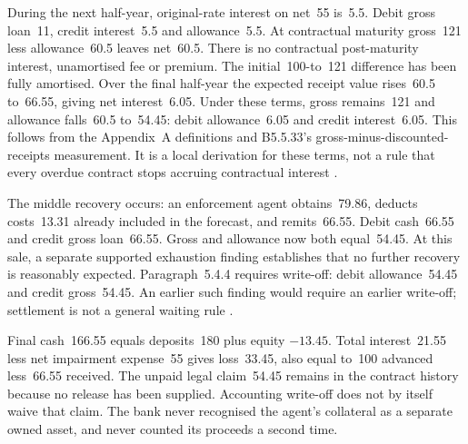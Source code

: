 During the next half-year, original-rate interest on net~55 is~5.5.
Debit gross loan~11, credit interest~5.5 and allowance~5.5. At contractual
maturity gross~121 less allowance~60.5 leaves net~60.5. There is no contractual
post-maturity interest, unamortised fee or premium. The initial~100-to~121
difference has been fully amortised. Over the final half-year the expected
receipt value rises~60.5 to~66.55, giving net interest~6.05. Under these terms,
gross remains~121 and allowance falls~60.5 to~54.45: debit allowance~6.05 and
credit interest~6.05. This follows from the Appendix~A definitions and
B5.5.33's gross-minus-discounted-receipts measurement. It is a local derivation
for these terms, not a rule that every overdue contract stops accruing
contractual interest \citep[Appendix~A, paragraph~5.4.1(b), B5.5.33]{aasb9dated}.

The middle recovery occurs: an enforcement agent obtains~79.86, deducts
costs~13.31 already included in the forecast, and remits~66.55.
Debit cash~66.55 and credit gross loan~66.55. Gross and allowance now both
equal~54.45. At this sale, a separate supported exhaustion finding establishes
that no further recovery is reasonably expected. Paragraph~5.4.4 requires
write-off: debit allowance~54.45 and credit gross~54.45. An earlier such
finding would require an earlier write-off; settlement is not a general
waiting rule \citep[paragraph~5.4.4]{aasb9dated}.

Final cash~166.55 equals deposits~180 plus equity $-13.45$. Total interest~21.55
less net impairment expense~55 gives loss~33.45, also equal to~100 advanced
less~66.55 received. The unpaid legal claim~54.45 remains in the contract
history because no release has been supplied. Accounting write-off does not
by itself waive that claim. The bank never recognised the agent's collateral
as a separate owned asset, and never counted its proceeds a second time.
 
